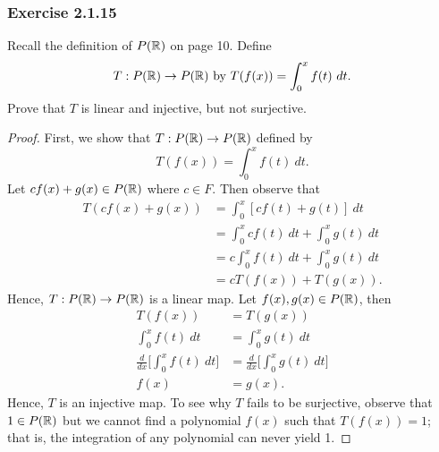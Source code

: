 \subsubsection{Exercise 2.1.15} Recall the definition of \( P(\mathbb{R}) \) on page 10. Define 
    \[ T: P(\R) \to P(\R)  \ \text{by} \   T(f(x)) = \int_{ 0 }^{ x }  f(t) \ dt. \]
Prove that \( T  \) is linear and injective, but not surjective.
\begin{proof}
First, we show that \( T: P(\mathbb{R}) \to P(\mathbb{R})   \) defined by 
\[  T(f(x)) = \int_{ 0 }^{ x }  f(t) \ dt. \]
Let \( cf(x) + g(x)  \in P(\mathbb{R}) \) where \( c \in F  \). Then observe that
\begin{align*}
    T(cf(x) + g(x) ) &= \int_{ 0 }^{ x }  [cf(t) + g(t)] \ dt \\
                     &= \int_{ 0 }^{ x } cf(t) \ dt + \int_{ 0 }^{ x } g(t) \ dt \\
                     &= c \int_{ 0 }^{ x }  f(t) \ dt + \int_{ 0 }^{ x }  g(t) \ dt \\
                     &= c T(f(x)) + T(g(x)).
\end{align*}
Hence, \( T: P(\mathbb{R}) \to P(\mathbb{R})  \) is a linear map. Let \( f(x) , g(x) \in P(\mathbb{R}) \), then
\begin{align*}
    T(f(x))&= T(g(x)) \\
    \int_{ 0 }^{ x }  f(t) \ dt &= \int_{ 0 }^{ x }  g(t) \ dt \\
    \frac{d  }{d x }  \Big[ \int_{ 0 }^{ x }  f(t) \ dt  \Big] &= \frac{d  }{d x }  \Big[ \int_{ 0 }^{ x }  g(t) \ dt  \Big] \\
    f(x) &= g(x).
\end{align*}
Hence, \( T  \) is an injective map. To see why \( T  \) fails to be surjective, observe that \( 1 \in P(\mathbb{R}) \) but we cannot find a polynomial \( f(x)  \) such that \( T(f(x)) = 1  \); that is, the integration of any polynomial can never yield 1. 
\end{proof}

